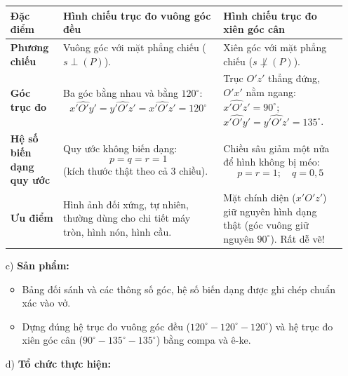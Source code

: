 \documentclass[12pt, a4paper]{article}
\begin{document}
\begin{itemize}[leftmargin=1.2cm]
    \begin{center}
    \begin{tabularx}{\textwidth}{|>{\bfseries}p{3.2cm}|X|X|}
    \hline
    \textbf{Đặc điểm} & \textbf{Hình chiếu trục đo vuông góc đều} & \textbf{Hình chiếu trục đo xiên góc cân} \\ \hline
    Phương chiếu & Vuông góc với mặt phẳng chiếu ($s \perp (P)$). & Xiên góc với mặt phẳng chiếu ($s \not\perp (P)$). \\ \hline
    Góc trục đo & Ba góc bằng nhau và bằng $120^\circ$:
    $$\widehat{x'O'y'} = \widehat{y'O'z'} = \widehat{x'O'z'} = 120^\circ$$ & Trục $O'z'$ thẳng đứng, $O'x'$ nằm ngang: $\widehat{x'O'z'} = 90^\circ$;
    $\widehat{x'O'y'} = \widehat{y'O'z'} = 135^\circ$. \\ \hline
    Hệ số biến dạng quy ước & Quy ước không biến dạng:
    $$p = q = r = 1$$ (kích thước thật theo cả 3 chiều). & Chiều sâu giảm một nửa để hình không bị méo:
    $$p = r = 1; \quad q = 0{,}5$$ \\ \hline
    Ưu điểm & Hình ảnh đối xứng, tự nhiên, thường dùng cho chi tiết máy tròn, hình nón, hình cầu. & Mặt chính diện ($x'O'z'$) giữ nguyên hình dạng thật (góc vuông giữ nguyên $90^\circ$). Rất dễ vẽ! \\ \hline
    \end{tabularx}
    \end{center}

    \item[c)] \textbf{Sản phẩm:}
    \begin{itemize}[leftmargin=0.6cm]
        \item Bảng đối sánh và các thông số góc, hệ số biến dạng được ghi chép chuẩn xác vào vở.
        \item Dựng đúng hệ trục đo vuông góc đều ($120^\circ - 120^\circ - 120^\circ$) và hệ trục đo xiên góc cân ($90^\circ - 135^\circ - 135^\circ$) bằng compa và ê-ke.
    \end{itemize}

    \item[d)] \textbf{Tổ chức thực hiện:}
\end{itemize}
\end{document}
